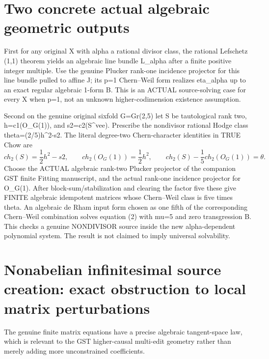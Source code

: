 \documentclass[11pt]{article}
\begin{document}
\section{Two concrete actual algebraic geometric outputs}
First for any original X with alpha a rational divisor class,
the rational Lefschetz (1,1) theorem yields an algebraic line
bundle L_alpha after a finite positive integer multiple.
Use the genuine Plucker rank-one incidence projector for this
line bundle pulled to affine J; its p=1 Chern--Weil form
realizes eta_alpha up to an exact regular algebraic 1-form B.
This is an ACTUAL source-solving case for every X when p=1,
not an unknown higher-codimension existence assumption.

Second on the genuine original sixfold
G=Gr(2,5) let S be tautological rank two,
h=c1(O_G(1)), and s2=c2(S^vee).
Prescribe the nondivisor rational Hodge class
theta=(2/5)h^2-s2. The literal degree-two
Chern-character identities in TRUE Chow are
\[
 ch_2(S)=\frac12h^2-s2,\qquad
 ch_2(O_G(1))=\frac12h^2,\qquad
 \boxed{ch_2(S)-\frac15ch_2(O_G(1))=\theta.}
 \tag{7}
\]
Choose the ACTUAL algebraic rank-two Plucker projector
of the companion GST finite Fitting manuscript,
and the actual rank-one incidence projector
for O_G(1). After block-sum/stabilization and
clearing the factor five these give FINITE algebraic
idempotent matrices whose Chern--Weil class is five times theta.
An algebraic de Rham input form chosen as one fifth of the
corresponding Chern--Weil combination solves equation (2)
with mu=5 and zero transgression B.
This checks a genuine NONDIVISOR source inside the
new alpha-dependent polynomial system.
The result is not claimed to imply universal solvability.

\section{Nonabelian infinitesimal source creation: exact obstruction to local matrix perturbations}
The genuine finite matrix equations have
a precise algebraic tangent-space law,
which is relevant to the GST higher-causal
multi-edit geometry rather than merely
adding more unconstrained coefficients.
\end{document}
